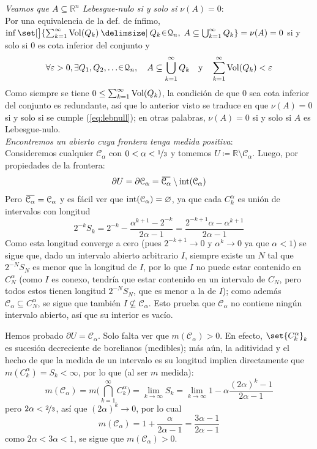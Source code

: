\begin{sol}
\emph{Veamos que $A \subseteq \mathbb{R}^n$ Lebesgue-nulo si y solo si $\nu(A) = 0$}:\\
Por una equivalencia de la def. de ínfimo, $\inf\set[\big]{ \sum^\infty_{k=1} \vol(Q_k) \given Q_k \en \mathcal{Q}_n,\; A \subseteq \bigcup^{\infty}_{k=1} Q_k} = \nu(A) = 0$ si y solo si $0$ es cota inferior del conjunto y
\begin{equation}\label{eq:lebnull}
\forall \varepsilon>0, \exists{Q_1,Q_2,\dots} \en \mathcal{Q}_n,\quad
A \subseteq \bigcup^{\infty}_{k=1} Q_k \quad\text{y}\quad\sum^\infty_{k=1} \vol(Q_k) < \varepsilon
\end{equation}
Como siempre se tiene $0 \leq \sum^\infty_{k=1} \operatorname{Vol}(Q_k)$, la condición de que $0$ sea cota inferior del conjunto es redundante, así que lo anterior visto se traduce en que $\nu(A) = 0$ si y solo si se cumple (\ref{eq:lebnull}); en otras palabras, $\nu(A) = 0$ si y solo si $A$ es Lebesgue-nulo.\vspace{1em}\\
\emph{Encontremos un abierto cuya frontera tenga medida positiva}:\\
Consideremos cualquier $\mathcal{C}_\alpha$ con $0 < \alpha < \nicefrac{1}{3}$ y tomemos $U \coloneq \mathbb{R}\setminus\mathcal{C}_\alpha$. Luego, por propiedades de la frontera:
\[
\partial U = \partial \mathcal{C}_\alpha = \ubar{\mathcal{C}_\alpha}\setminus\inter(\mathcal{C}_\alpha)
\]
Pero $\ubar{\mathcal{C}_\alpha}=\mathcal{C}_\alpha$ y es fácil ver que $\operatorname{int}(\mathcal{C}_\alpha) = \varnothing$, ya que cada $C^\alpha_k$ es unión de intervalos con longitud
\[
2^{-k}S_k
= 2^{-k} - \frac{\alpha^{k+1} - 2^{-k}}{2\alpha-1} = \frac{2^{-k+1}\alpha - \alpha^{k+1}}{2\alpha-1} 
\]
Como esta longitud converge a cero (pues $2^{-k+1} \to 0$ y $\alpha^k \to 0$ ya que $\alpha<1$) se sigue que, dado un intervalo abierto arbitrario $I$, siempre existe un $N$ tal que $2^{-N}S_N$ es menor que la longitud de $I$, por lo que $I$ no puede estar contenido en $C^\alpha_N$ (como $I$ es conexo, tendría que estar contenido en un intervalo de $C_N$, pero todos estos tienen longitud $2^{-N}S_N$, que es menor a la de $I$); como además $\mathcal{C}_\alpha \subseteq C^\alpha_N$, se sigue que también $I \not\subseteq \mathcal{C}_\alpha$. Esto prueba que $\mathcal{C}_\alpha$ no contiene ningún intervalo abierto, así que su interior es vacío.\par
Hemos probado $\partial U = \mathcal{C}_\alpha$. Solo falta ver que $m(\mathcal{C}_\alpha)>0$. En efecto, $\set{C^\alpha_k}_k$ es sucesión decreciente de borelianos (medibles); más aún, la aditividad y el hecho de que la medida de un intervalo es su longitud implica directamente que $m(C^\alpha_k) = S_k < \infty$, por lo que (al ser $m$ medida):
\[
m(\mathcal{C}_\alpha) = m\biggl(\bigcap^\infty_{k=1} C^\alpha_k\biggr) = \lim_{k\to\infty} S_k = \lim_{k\to\infty} 1 - \alpha\frac{(2\alpha)^k - 1}{2\alpha-1}
\]
pero $2\alpha < \nicefrac{2}{3}$, así que $(2\alpha)^k \to 0$, por lo cual
\[
m(\mathcal{C}_\alpha) = 1+ \frac{\alpha}{2\alpha-1} = \frac{3\alpha-1}{2\alpha-1}
\]
como $2\alpha < 3\alpha < 1$, se sigue que $m(\mathcal{C}_\alpha) > 0$.
\end{sol}